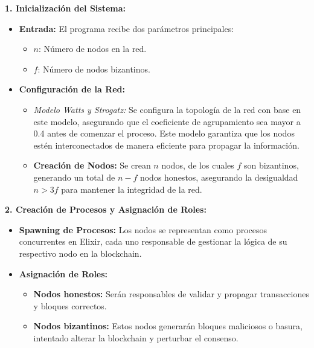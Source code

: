 {\large{
    \textbf{1. Inicialización del Sistema:}
    \begin{itemize}
        \item \textbf{Entrada:} El programa recibe dos parámetros principales:
        \begin{itemize}
            \item $n$: Número de nodos en la red.
            \item $f$: Número de nodos bizantinos.
        \end{itemize}
        \item \textbf{Configuración de la Red:}
        \begin{itemize}
            \item \textit{Modelo Watts y Strogatz:} Se configura la topología de la red con base en este modelo, asegurando que el coeficiente de agrupamiento sea mayor a 0.4 antes de comenzar el proceso. Este modelo garantiza que los nodos estén interconectados de manera eficiente para propagar la información.
            \item \textbf{Creación de Nodos:} Se crean $n$ nodos, de los cuales $f$ son bizantinos, generando un total de $n - f$ nodos honestos, asegurando la desigualdad $n > 3f$ para mantener la integridad de la red.
        \end{itemize}
    \end{itemize}

    \vspace{0.5cm}

    \textbf{2. Creación de Procesos y Asignación de Roles:}
    \begin{itemize}
        \item \textbf{Spawning de Procesos:} Los nodos se representan como procesos concurrentes en Elixir, cada uno responsable de gestionar la lógica de su respectivo nodo en la blockchain.
        \item \textbf{Asignación de Roles:}
        \begin{itemize}
            \item \textbf{Nodos honestos:} Serán responsables de validar y propagar transacciones y bloques correctos.
            \item \textbf{Nodos bizantinos:} Estos nodos generarán bloques maliciosos o basura, intentado alterar la blockchain y perturbar el consenso.
        \end{itemize}
    \end{itemize}

    \vspace{0.5cm}

}}
